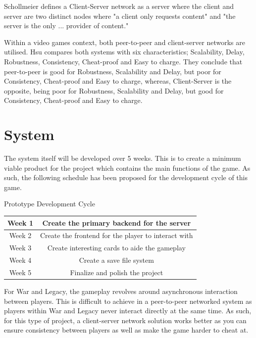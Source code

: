 \documentclass{article}
\begin{document}
Schollmeier defines a Client-Server network as a server where the client and server are two distinct nodes where "a client only requests content" and "the server is the only ... provider of content."

Within a video games context, both peer-to-peer and client-server networks are utilised. Hsu compares both systems\cite{hsu2003} with six characteristics; Scalability, Delay, Robustness, Consistency, Cheat-proof and Easy to charge. They conclude that peer-to-peer is good for Robustness, Scalability and Delay, but poor for Consistency, Cheat-proof and Easy to charge, whereas, Client-Server is the opposite, being poor for Robustness, Scalability and Delay, but good for Consistency, Cheat-proof and Easy to charge.

\section{System}

The system itself will be developed over 5 weeks. This is to create a minimum viable product for the project which contains the main functions of the game. As such, the following schedule has been proposed for the development cycle of this game.

\begin{center}
    Prototype Development Cycle
    \begin{tabular}{ |c|c| }
        \hline
        Week 1 & Create the primary backend for the server \\
        \hline
        Week 2 & Create the frontend for the player to interact with \\  
        \hline
        Week 3 & Create interesting cards to aide the gameplay \\  
        \hline
        Week 4 & Create a save file system \\  
        \hline
        Week 5 & Finalize and polish the project \\  
        \hline
    \end{tabular}
\end{center}

For War and Legacy, the gameplay revolves around asynchronous interaction between players. This is difficult to achieve in a peer-to-peer networked system as players within War and Legacy never interact directly at the same time. As such, for this type of project, a client-server network solution works better as you can ensure consistency between players as well as make the game harder to cheat at.
\end{document}
